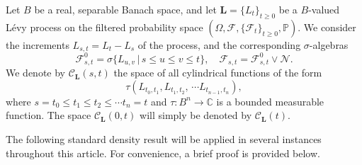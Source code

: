 \documentclass[11pt]{amsart}
\theoremstyle{definition}
\theoremstyle{remark}
\numberwithin{equation}{section}
\newcommand{\m}{\mathcal }
\begin{document}
Let \(B\) be a real, separable  Banach space, and let \(\bm{L}=\{L_t\}_{t\geq 0}\) be a \(B\)-valued L\'evy process on the filtered probability space \((\Omega, \m{F}, \{\m{F}_t\}_{t\geq 0}, \mathbb{P})\).  We consider the increments \(L_{s,t}=L_t-L_s\) of the process,  and the corresponding \(\sigma\)-algebras \[\m{F}_{s,t}^0=\sigma \{L_{u, v}\,|\,s\leq u\leq v\leq t\},\quad \m{F}_{s,t}=\m{F}_{s,t}^0\vee \m{N}.\] We denote by $\m{C}_{\bm{L}}(s,t)$ the space of all cylindrical functions of the form \[\tau(L_{t_0, t_1}, L_{t_1, t_2},\,\cdots L_{t_{n-1},t_n}),\] where \(s=t_0\leq t_1\leq t_2\leq \cdots t_n=t\) and \(\tau:B^n\to \mathbb{C}\) is a bounded measurable function. The space \(\m{C}_{\bm{L}}(0,t)\) will simply be denoted by  \(\m{C}_{\bm{L}}(t)\). 

The following standard density result will be applied in several instances throughout this article. For convenience, a brief proof is provided below.
\end{document}
